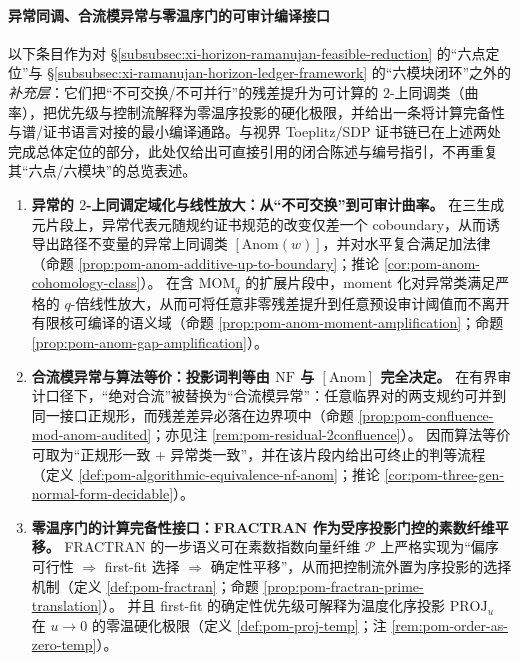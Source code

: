 \paragraph{异常同调、合流模异常与零温序门的可审计编译接口}
以下条目作为对 \S\ref{subsubsec:xi-horizon-ramanujan-feasible-reduction} 的“六点定位”与 \S\ref{subsubsec:xi-ramanujan-horizon-ledger-framework} 的“六模块闭环”之外的\emph{补充层}：它们把“不可交换/不可并行”的残差提升为可计算的 \(2\)-上同调类（曲率），把优先级与控制流解释为零温序投影的硬化极限，并给出一条将计算完备性与谱/证书语言对接的最小编译通路。与视界 Toeplitz/SDP 证书链已在上述两处完成总体定位的部分，此处仅给出可直接引用的闭合陈述与编号指引，不再重复其“六点/六模块”的总览表述。
\begin{enumerate}
  \item \textbf{异常的 \(2\)-上同调定域化与线性放大：从“不可交换”到可审计曲率。}
  在三生成元片段上，异常代表元随规约证书规范的改变仅差一个 coboundary，从而诱导出路径不变量的异常上同调类 \([\mathrm{Anom}(w)]\)，并对水平复合满足加法律（命题 \ref{prop:pom-anom-additive-up-to-boundary}；推论 \ref{cor:pom-anom-cohomology-class}）。
  在含 \(\mathrm{MOM}_q\) 的扩展片段中，moment 化对异常类满足严格的 \(q\)-倍线性放大，从而可将任意非零残差提升到任意预设审计阈值而不离开有限核可编译的语义域（命题 \ref{prop:pom-anom-moment-amplification}；命题 \ref{prop:pom-anom-gap-amplification}）。

  \item \textbf{合流模异常与算法等价：投影词判等由 \texorpdfstring{$\mathrm{NF}$}{NF} 与 \texorpdfstring{$[\mathrm{Anom}]$}{[Anom]} 完全决定。}
  在有界审计口径下，“绝对合流”被替换为“合流模异常”：任意临界对的两支规约可并到同一接口正规形，而残差差异必落在边界项中（命题 \ref{prop:pom-confluence-mod-anom-audited}；亦见注 \ref{rem:pom-residual-2confluence}）。
  因而算法等价可取为“正规形一致 + 异常类一致”，并在该片段内给出可终止的判等流程（定义 \ref{def:pom-algorithmic-equivalence-nf-anom}；推论 \ref{cor:pom-three-gen-normal-form-decidable}）。

  \item \textbf{零温序门的计算完备性接口：FRACTRAN 作为受序投影门控的素数纤维平移。}
  FRACTRAN 的一步语义可在素数指数向量纤维 \(\mathcal{P}\) 上严格实现为“偏序可行性 \(\Rightarrow\) first-fit 选择 \(\Rightarrow\) 确定性平移”，从而把控制流外置为序投影的选择机制（定义 \ref{def:pom-fractran}；命题 \ref{prop:pom-fractran-prime-translation}）。
  并且 first-fit 的确定性优先级可解释为温度化序投影 \(\mathrm{PROJ}_u\) 在 \(u\to 0\) 的零温硬化极限（定义 \ref{def:pom-proj-temp}；注 \ref{rem:pom-order-as-zero-temp}）。


\end{enumerate}
